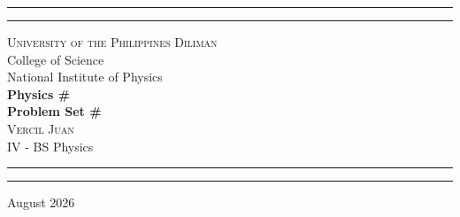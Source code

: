 \begin{titlepage}
    \vspace*{2.5in}
    \hrule
    \vspace{3pt}
    \hrule
    \vspace{0.25in}
    \begin{center}
		{
			\Large 
			\textsc{
				University of the Philippines Diliman
			}
			\\[4pt]
			College of Science
			\\[4pt]
			National Institute of Physics
		}
		\\[0.5cm]
		{
			\Huge
			\textbf{
				Physics \#
				\\[5pt]
				Problem Set \#
			}
		}
		\\[0.75cm]
		{
			\Large 
			\textsc{
				Vercil Juan
			}
		}\\[5pt] 
		{
			\large 
			IV - BS Physics
		}
    \end{center}
    \vspace{0.25in}
    \hrule
    \vspace{3pt}
    \hrule 
    \vfill
    \begin{center}
    {\large 
		August 2026
	}
    \end{center}
\end{titlepage}
